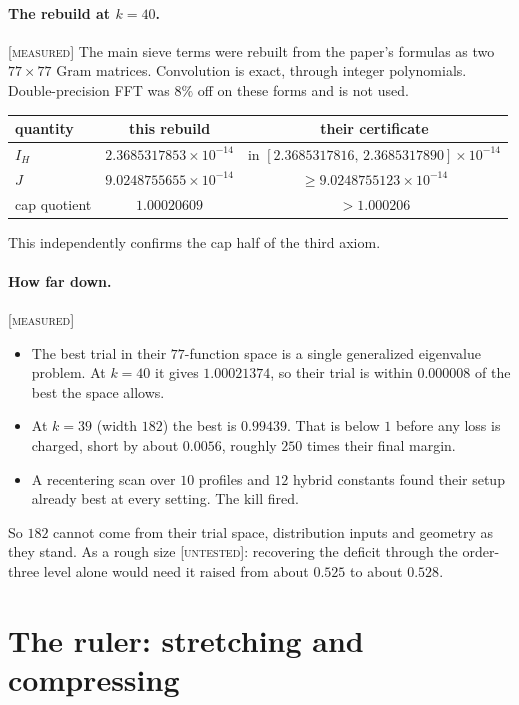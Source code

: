 \documentclass[11pt]{article}
\theoremstyle{definition}
\theoremstyle{remark}
\newcommand{\grade}[1]{\textsc{[#1]}}
\begin{document}
\paragraph{The rebuild at $k=40$.} \grade{measured}
The main sieve terms were rebuilt from the paper's formulas as two $77\times77$ Gram matrices. Convolution is exact, through integer polynomials. Double-precision FFT was $8\%$ off on these forms and is not used.
\begin{center}\begin{tabular}{lcc}
\toprule
quantity & this rebuild & their certificate\\
\midrule
$I_H$ & $2.3685317853\times10^{-14}$ & in $[2.3685317816,\,2.3685317890]\times10^{-14}$\\
$J$ & $9.0248755655\times10^{-14}$ & $\ge9.0248755123\times10^{-14}$\\
cap quotient & $1.00020609$ & $>1.000206$\\
\bottomrule
\end{tabular}\end{center}
This independently confirms the cap half of the third axiom.

\paragraph{How far down.} \grade{measured}
\begin{itemize}
\item The best trial in their $77$-function space is a single generalized eigenvalue problem. At $k=40$ it gives $1.00021374$, so their trial is within $0.000008$ of the best the space allows.
\item At $k=39$ (width $182$) the best is $0.99439$. That is below $1$ before any loss is charged, short by about $0.0056$, roughly $250$ times their final margin.
\item A recentering scan over $10$ profiles and $12$ hybrid constants found their setup already best at every setting. The kill fired.
\end{itemize}
So $182$ cannot come from their trial space, distribution inputs and geometry as they stand. As a rough size \grade{untested}: recovering the deficit through the order-three level alone would need it raised from about $0.525$ to about $0.528$.

\section{The ruler: stretching and compressing}
\end{document}
